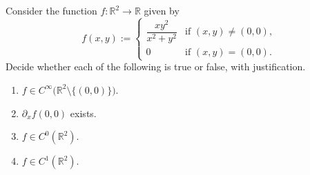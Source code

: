\begin{exercise}
\label{ex:regularity_ladder_xy2}
Consider the function $f : \mathbb{R}^2 \to \mathbb{R}$ given by
\[f(x,y) := \begin{cases} \dfrac{xy^2}{x^2+y^2} & \text{if } (x,y) \neq (0,0), \\[1ex]
  0 & \text{if } (x,y) = (0,0).\end{cases}\]
Decide whether each of the following is true or false, with justification.
\begin{enumerate}[label=\textbf{(\alph*)}]
  \item $f \in C^\infty\big(\mathbb{R}^2\setminus\{(0,0)\}\big)$.
  \item $\partial_x f(0,0)$ exists.
  \item $f \in C^0(\mathbb{R}^2)$.
  \item $f \in C^1(\mathbb{R}^2)$.
\end{enumerate}
\end{exercise}
